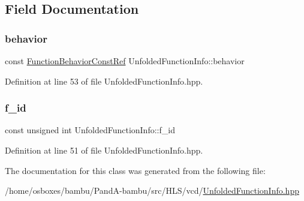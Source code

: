 \subsection{Field Documentation}
\mbox{\label{classUnfoldedFunctionInfo_a38c061b15269099ab396545f034a063f}} 
\subsubsection{\texorpdfstring{behavior}{behavior}}
{\footnotesize\ttfamily const \hyperlink{function__behavior_8hpp_a94872da12ed056b6ecf90456164e0213}{Function\+Behavior\+Const\+Ref} Unfolded\+Function\+Info\+::behavior}



Definition at line 53 of file Unfolded\+Function\+Info.\+hpp.

\mbox{\label{classUnfoldedFunctionInfo_a577d532d65638db644d68913567904fa}} 
\subsubsection{\texorpdfstring{f\+\_\+id}{f\_id}}
{\footnotesize\ttfamily const unsigned int Unfolded\+Function\+Info\+::f\+\_\+id}



Definition at line 51 of file Unfolded\+Function\+Info.\+hpp.



The documentation for this class was generated from the following file\+:\begin{DoxyCompactItemize}
\item 
/home/osboxes/bambu/\+Pand\+A-\/bambu/src/\+H\+L\+S/vcd/\hyperlink{UnfoldedFunctionInfo_8hpp}{Unfolded\+Function\+Info.\+hpp}\end{DoxyCompactItemize}
